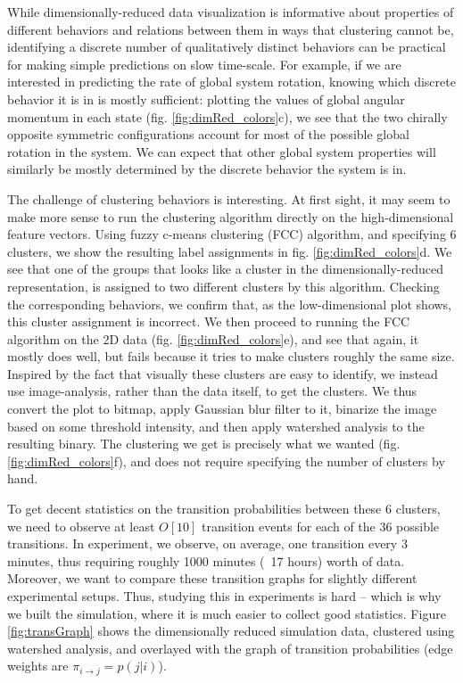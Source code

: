 \documentclass[reprint,prx]{revtex4-1}
\renewcommand{\=}[1]{\stackrel{#1}{=}} %
\renewcommand{\(}{\left (}
\renewcommand{\)}{\right  )}
\renewcommand{\[}{\left [}
\renewcommand{\]}{\right ]}
\newcommand{\<}{\left <}
\renewcommand{\>}{\right >}
\theoremstyle{definition}
\theoremstyle{remark}
\newcommand{\Ord}[1]{O\[#1\]}  %
\begin{document}
While dimensionally-reduced data visualization is informative about properties of different behaviors and relations between them in ways that clustering cannot be, identifying a discrete number of qualitatively distinct behaviors can be practical for making simple predictions on slow time-scale. For example, if we are interested in predicting the rate of global system rotation, knowing which discrete behavior it is in is mostly sufficient: plotting the values of global angular momentum in each state (fig. \ref{fig:dimRed_colors}c), we see that the two chirally opposite symmetric configurations account for most of the possible global rotation in the system. We can expect that other global system properties will similarly be mostly determined by the discrete behavior the system is in. 

The challenge of clustering behaviors is interesting. At first sight, it may seem to make more sense to run the clustering algorithm directly on the high-dimensional feature vectors. Using fuzzy c-means clustering (FCC) algorithm, and specifying 6 clusters, we show the resulting label assignments in fig. \ref{fig:dimRed_colors}d. We see that one of the groups that looks like a cluster in the dimensionally-reduced representation, is assigned to two different clusters by this algorithm. Checking the corresponding behaviors, we confirm that, as the low-dimensional plot shows, this cluster assignment is incorrect. We then proceed to running the FCC algorithm on the 2D data (fig. \ref{fig:dimRed_colors}e), and see that again, it mostly does well, but fails because it tries to make clusters roughly the same size. Inspired by the fact that visually these clusters are easy to identify, we instead use image-analysis, rather than the data itself, to get the clusters. We thus convert the plot to bitmap, apply Gaussian blur filter to it, binarize the image based on some threshold intensity, and then apply watershed analysis to the resulting binary. The clustering we get is precisely what we wanted (fig. \ref{fig:dimRed_colors}f), and does not require specifying the number of clusters by hand.

To get decent statistics on the transition probabilities between these 6 clusters, we need to observe at least $ \Ord{10} $ transition events for each of the 36 possible transitions. In experiment, we observe, on average, one transition every 3 minutes, thus requiring roughly 1000 minutes (~17 hours) worth of data. Moreover, we want to compare these transition graphs for slightly different experimental setups. Thus, studying this in experiments is hard -- which is why we built the simulation, where it is much easier to collect good statistics. Figure \ref{fig:transGraph} shows the dimensionally reduced simulation data, clustered using watershed analysis, and overlayed with the graph of transition probabilities (edge weights are $ \pi_{i\rightarrow j} =p(j|i) $).
\end{document}
